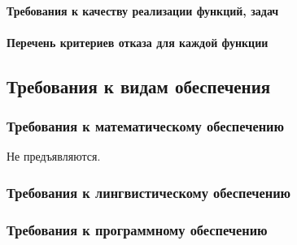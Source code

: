 \documentclass[a4paper, 12pt]{article}		%
\begin{document}
\paragraph{Требования к качеству реализации функций, задач\\}

\paragraph{Перечень критериев отказа для каждой функции\\}

\subsection{Требования к видам обеспечения}
\subsubsection{Требования к математическому обеспечению}


Не предъявляются.

\subsubsection{Требования к лингвистическому обеспечению}


\subsubsection{Требования к программному обеспечению}

\end{document}
